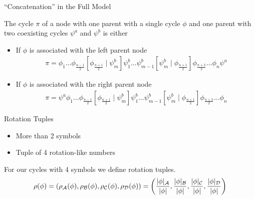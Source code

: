 \begin{frame}{``Concatenation'' in the Full Model}
	\vspace{-1em}
	\begin{theorem}
		The cycle $\pi$ of a node with one parent with a single cycle $\phi$ and one parent with two coexisting cycles $\psi^a$ and $\psi^b$ is either
		\begin{itemize}
			\item If $\phi$ is associated with the left parent node
			      \begin{align*}
				      \pi = \phi_1 \dots \phi_{\frac{n-1}{2}} \left[\phi_{\frac{n+1}{2}} \mid \psi^b_m\right] \psi^b_1 \dots \psi^b_{m-1} \left[\psi^b_m \mid \phi_{\frac{n+1}{2}}\right] \phi_{\frac{n+3}{2}} \dots \phi_n \psi^a
			      \end{align*}
			\item If $\phi$ is associated with the right parent node
			      \begin{align*}
				      \pi = \psi^a \phi_1 \dots \phi_{\frac{n-1}{2}} \left[\phi_{\frac{n+1}{2}} \mid \psi^b_m\right] \psi^b_1 \dots \psi^b_{m-1} \left[\psi^b_m \mid \phi_{\frac{n+1}{2}}\right] \phi_{\frac{n+3}{2}} \dots \phi_n
			      \end{align*}
		\end{itemize}
	\end{theorem}
\end{frame}

\begin{frame}{Rotation Tuples}
	\begin{itemize}
		\item More than 2 symbols
		\item Tuple of 4 rotation-like numbers
	\end{itemize}
	\pause
	\begin{definition}
		For our cycles with 4 symbols we define rotation tuples.
		\begin{align*}
			\rho(\phi)
			= (\rho_{\mathcal{A}}(\phi), \rho_{\mathcal{B}}(\phi), \rho_{\mathcal{C}}(\phi), \rho_{\mathcal{D}}(\phi))
			= \left(\frac{|\phi|_{\mathcal{A}}}{|\phi|}, \frac{|\phi|_{\mathcal{B}}}{|\phi|}, \frac{|\phi|_{\mathcal{C}}}{|\phi|}, \frac{|\phi|_{\mathcal{D}}}{|\phi|}\right)
		\end{align*}
	\end{definition}
\end{frame}


